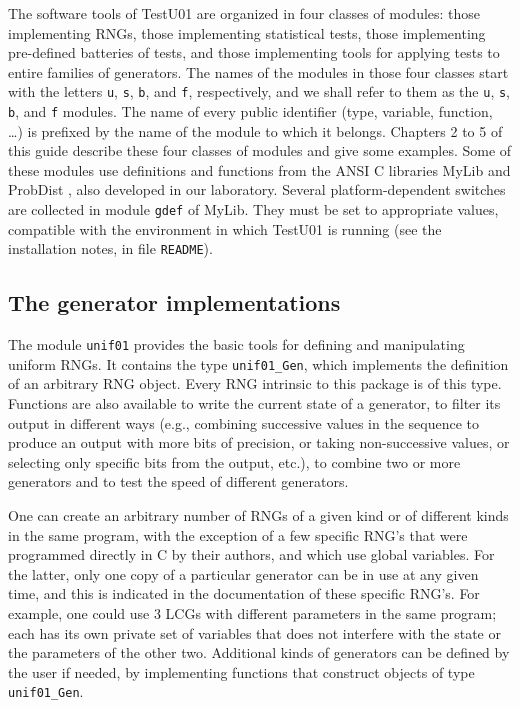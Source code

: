 The software tools of {TestU01} are organized in four classes of modules:
those implementing RNGs, those implementing statistical tests, 
those implementing pre-defined batteries of tests, and those 
implementing tools for applying tests to entire families of generators.
The names of the modules in those four classes start with the letters
{\tt u}, {\tt s}, {\tt b}, and {\tt f}, respectively, and we shall refer 
to them as the {\tt u}, {\tt s}, {\tt b}, and {\tt f} modules.
The name of every public identifier (type, variable, function, \dots)
is prefixed by the name of the module to which it belongs.
Chapters 2 to 5 of this guide describe these four classes of modules
and give some examples.
Some of these modules use definitions and functions from
the ANSI C libraries MyLib and ProbDist \cite{iLEC01m,iLEC01p}, 
also developed in our laboratory.
Several platform-dependent switches are collected in module {\tt gdef}
of MyLib.  They must be set to appropriate values, compatible with the
environment in which {TestU01} is running
(see the installation notes, in file {\tt README}).


\subsection {The generator implementations}

The module {\tt unif01} provides the basic tools for defining and
manipulating uniform RNGs.  It contains the type
{\tt unif01\_Gen}, which implements the definition of an arbitrary RNG
object. Every RNG intrinsic to this package is of this type.
Functions are also available to write the current state of a generator,
to filter its output in different ways (e.g., combining successive
values in the sequence to produce an output with more bits of precision, 
or taking non-successive values, or selecting only specific bits from 
the output, etc.), to combine two or more generators and to test the
speed of different generators.

One can create an arbitrary number of RNGs of a given kind or of 
different kinds in the same program,
with the exception of a few specific RNG's that were programmed directly
in C by their authors, and which use global variables.
For the latter, only one copy of a particular generator can be
in use at any given time, and this is indicated in the documentation of
these specific RNG's. For example, one could use 3 LCGs with different
parameters in the same program; each has its own private set of variables
that does not interfere with the state or the parameters of the other two.
Additional kinds of generators can be defined by the user if needed, 
by implementing functions that construct objects of type {\tt unif01\_Gen}.

